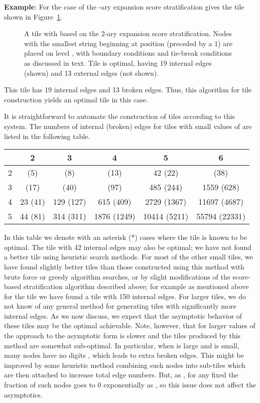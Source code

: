 \documentclass[12pt]{article}
\begin{document}
\noindent
{\bf Example}: For the case of  the -ary expansion
score stratification gives the tile shown in Figure~\ref{f:tile-24}.
\begin{figure}
\begin{center}
\end{center}
\caption[x]{\footnotesize A tile with  based on the
2-ary expansion score stratification.  Nodes with the smallest string
beginning at position  (preceded by a 1) are placed on level ,
with boundary conditions and tie-break conditions as discussed in
text.
Tile is optimal, having 19 internal edges (shown) and 13 external edges (not shown).}
\label{f:tile-24}
\end{figure}
This tile has 19 internal edges and 13 broken edges.  Thus, this
algorithm for tile construction yields an optimal tile in this case.
\vspace*{0.1in}

It is straightforward to automate the construction of tiles according
to this system.  The numbers of internal (broken) edges for tiles with
small values of  are listed in the following table.

\begin{center}
\begin{tabular}{|| c  || c | c | c | c |c  ||}
\hline
\hline
 & 2 & 3 & 4 & 5 & 6\\
\hline
\hline
2 &  (5) &  (8) &  (13) & 42 (22) &  (38)\\
3 &  (17) &  (40) &  (97) & 485 (244) & 1559 (628)\\
4 & 23 (41) & 129 (127) & 615 (409) & 2729 (1367) & 11697 (4687)\\
5 & 44 (81) & 314 (311) & 1876 (1249) & 10414 (5211) & 55794 (22331)\\
\hline
\hline
\end{tabular}
\end{center}

In this table we denote with an asterisk (*) cases where the tile is
known to be optimal.  The  tile with 42 internal edges may also
be optimal; we have not found a better tile using heuristic search
methods.  For most of the other small tiles, we have found slightly
better tiles than those constructed using this method with brute force
or greedy algorithm searches, or by slight modifications of the
score-based stratification algorithm described above; for example as
mentioned above for the  tile we have found a tile with 150
internal edges.  For larger tiles, we do not know of any general
method for generating tiles with significantly more internal edges.  As we now
discuss, we expect that the asymptotic behavior of these tiles may be
the optimal achievable.  Note, however, that for larger values of 
the approach to the asymptotic form is slower and the tiles produced
by this method are somewhat sub-optimal.  In particular, when  is
large and  is small, many nodes have no digits , which
leads to extra broken edges.  This might be improved by some heuristic
method combining such nodes into sub-tiles which are then attached to
increase total edge numbers.  But, as , for any
fixed  the fraction of such nodes goes to 0 exponentially as , so this issue does not affect the asymptotics.
\end{document}
